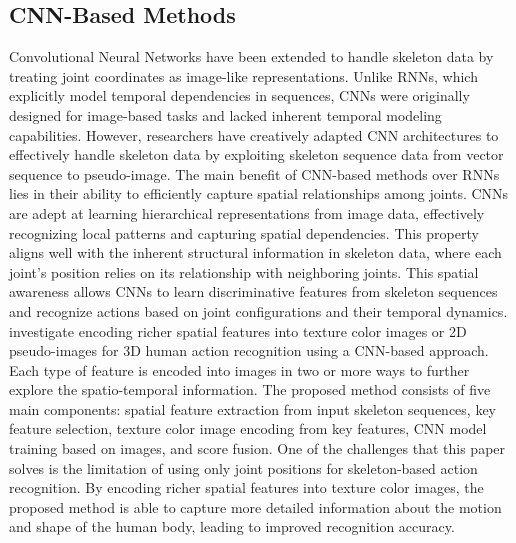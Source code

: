 \subsection{CNN-Based Methods}
Convolutional Neural Networks have been extended to handle skeleton data by treating joint coordinates as image-like representations. Unlike RNNs, which explicitly model temporal dependencies in sequences, CNNs were originally designed for image-based tasks and lacked inherent temporal modeling capabilities. However, researchers have creatively adapted CNN architectures to effectively handle skeleton data by exploiting skeleton sequence data from vector sequence to pseudo-image. The main benefit of CNN-based methods over RNNs lies in their ability to efficiently capture spatial relationships among joints. CNNs are adept at learning hierarchical representations from image data, effectively recognizing local patterns and capturing spatial dependencies. This property aligns well with the inherent structural information in skeleton data, where each joint's position relies on its relationship with neighboring joints. This spatial awareness allows CNNs to learn discriminative features from skeleton sequences and recognize actions based on joint configurations and their temporal dynamics.\cite{ding2017investigation} investigate encoding richer spatial features into texture color images or 2D pseudo-images for 3D human action recognition using a CNN-based approach. Each type of feature is encoded into images in two or more ways to further explore the spatio-temporal information. The proposed method consists of five main components: spatial feature extraction from input skeleton sequences, key feature selection, texture color image encoding from key features, CNN model training based on images, and score fusion. One of the challenges that this paper solves is the limitation of using only joint positions for skeleton-based action recognition. By encoding richer spatial features into texture color images, the proposed method is able to capture more detailed information about the motion and shape of the human body, leading to improved recognition accuracy.

